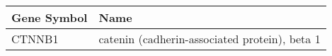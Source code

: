 \begin{tabular}{ll}
\toprule
Gene Symbol &                                          Name \\
\midrule
     CTNNB1 & catenin (cadherin-associated protein), beta 1 \\
\bottomrule
\end{tabular}
